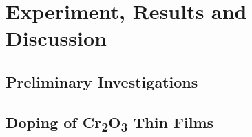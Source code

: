 \chapter{Experiment, Results and Discussion}

\section{Preliminary Investigations}
    \label{Sec:Results_Preliminary}
    
\clearpage

\section{Doping of \texorpdfstring{C\lowercase{r}\textsubscript{2}O\textsubscript{3}}{Cr2O3} Thin Films}
    \label{Sec:Results_Doping}
    


